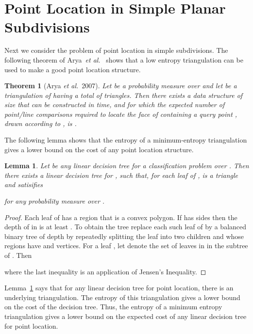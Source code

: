 \documentclass[lotsofwhite]{patmorin}
\newcommand{\seclabel}[1]{\label{sec:#1}}
\newtheorem{thm}{Theorem}{\bfseries}{\itshape}
\newcommand{\thmlabel}[1]{\label{thm:#1}}
\newtheorem{lem}{Lemma}{\bfseries}{\itshape}
\newcommand{\lemlabel}[1]{\label{lem:#1}}
\newcommand{\lemref}[1]{Lemma~\ref{lem:#1}}
\newcommand{\etal}{\emph{et al.}}
\begin{document}
\section{Point Location in Simple Planar Subdivisions}
\seclabel{subdivisions}

Next we consider the problem of point location in simple
subdivisions.  The following theorem of Arya~\etal~\cite{ammw07}
shows that a low entropy triangulation can be used to make a good
point location structure.

\begin{thm}[Arya \etal\ 2007]\thmlabel{ammw07}
Let  be a probability measure over  and let  be a
triangulation of  having a total of  triangles.  Then there exists a
data structure of size  that can be constructed in 
time, and for which the expected number of point/line comparisons
required to locate the face of  containing a query point , drawn
according to , is .
\end{thm}

The following lemma shows that the entropy of a minimum-entropy
triangulation gives a lower bound on the cost of any point location
structure.

\begin{lem}\lemlabel{triangulate}
Let  be any linear decision tree for a classification problem
 over .  Then there exists a linear decision tree
 for , such that, for each leaf  of ,
 is a triangle and  satisifies

for any probability measure  over .
\end{lem}

\begin{proof}
Each leaf  of  has a region  that is a convex
polygon.  If  has  sides then the depth of  in 
is at least .  To obtain the tree  replace each such leaf
 of  by a balanced binary tree of depth  by
repeatedly splitting the leaf into two children  and 
whose regions have  and  vertices.
For a leaf , let  denote the set of leaves in 
in the subtree of .   Then

where the last inequality is an application of Jensen's Inequality.
\end{proof}

\lemref{triangulate} says that for any linear decision tree for point
location, there is an underlying triangulation.  The entropy of this
triangulation gives a lower bound on the cost of the decision tree.
Thus, the entropy of a minimum entropy triangulation gives a lower
bound on the expected cost of any linear decision tree for point
location.
\end{document}

